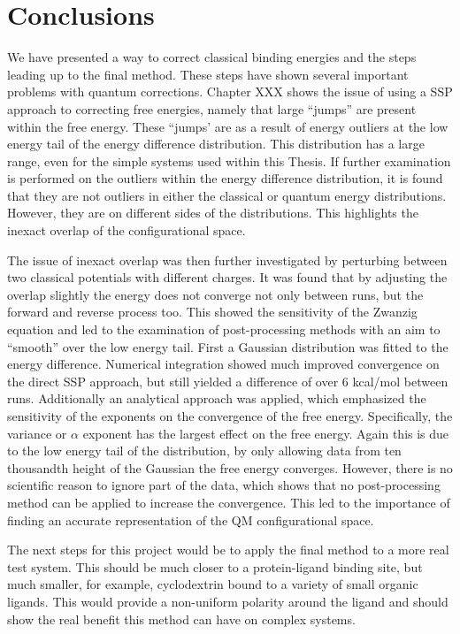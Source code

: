 \chapter{Conclusions} \label{Chapter:conclusions}

We have presented a way to correct classical binding energies and the steps leading up to the final method.  These steps have shown several important problems with quantum corrections.  Chapter XXX shows the issue of using a SSP approach to correcting free energies, namely that large ``jumps'' are present within the free energy.  These ``jumps' are as a result of energy outliers at the low energy tail of the energy difference distribution.  This distribution has a large range, even for the simple systems used within this Thesis.  If further examination is performed on the outliers within the energy difference distribution, it is found that they are not outliers in either the classical or quantum energy distributions.  However, they are on different sides of the distributions.  This highlights the inexact overlap of the configurational space.

The issue of inexact overlap was then further investigated by perturbing between two classical potentials with different charges.  It was found that by adjusting the overlap slightly the energy does not converge not only between runs, but the forward and reverse process too.  This showed the sensitivity of the Zwanzig equation and led to the examination of post-processing methods with an aim to ``smooth'' over the low energy tail.  First a Gaussian distribution was fitted to the energy difference.  Numerical integration showed much improved convergence on the direct SSP approach, but still yielded a difference of over 6 kcal/mol between runs.  Additionally an analytical approach was applied, which emphasized the sensitivity of the exponents on the convergence of the free energy.  Specifically, the variance or $\alpha$ exponent has the largest effect on the free energy.  Again this is due to the low energy tail of the distribution, by only allowing data from ten thousandth height of the Gaussian the free energy converges.  However, there is no scientific reason to ignore part of the data, which shows that no post-processing method can be applied to increase the convergence.  This led to the importance of finding an accurate representation of the QM configurational space.






The next steps for this project would be to apply the final method to a more real test system.  This should be much closer to a protein-ligand binding site, but much smaller, for example, cyclodextrin bound to a variety of small organic ligands.  This would provide a non-uniform polarity around the ligand and should show the real benefit this method can have on complex systems.